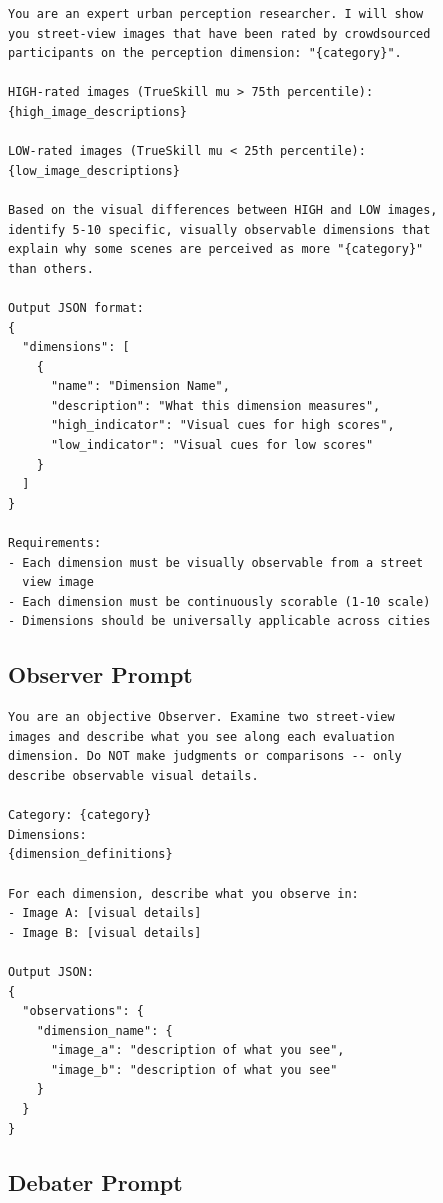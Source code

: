 \documentclass[runningheads]{llncs}
\begin{document}
\begin{lstlisting}[caption={Dimension extraction prompt (Stage 1).}]
You are an expert urban perception researcher. I will show
you street-view images that have been rated by crowdsourced
participants on the perception dimension: "{category}".

HIGH-rated images (TrueSkill mu > 75th percentile):
{high_image_descriptions}

LOW-rated images (TrueSkill mu < 25th percentile):
{low_image_descriptions}

Based on the visual differences between HIGH and LOW images,
identify 5-10 specific, visually observable dimensions that
explain why some scenes are perceived as more "{category}"
than others.

Output JSON format:
{
  "dimensions": [
    {
      "name": "Dimension Name",
      "description": "What this dimension measures",
      "high_indicator": "Visual cues for high scores",
      "low_indicator": "Visual cues for low scores"
    }
  ]
}

Requirements:
- Each dimension must be visually observable from a street
  view image
- Each dimension must be continuously scorable (1-10 scale)
- Dimensions should be universally applicable across cities
\end{lstlisting}

\subsection{Observer Prompt}

\begin{lstlisting}[caption={Observer agent prompt (Stage 2, Mode 4).}]
You are an objective Observer. Examine two street-view
images and describe what you see along each evaluation
dimension. Do NOT make judgments or comparisons -- only
describe observable visual details.

Category: {category}
Dimensions:
{dimension_definitions}

For each dimension, describe what you observe in:
- Image A: [visual details]
- Image B: [visual details]

Output JSON:
{
  "observations": {
    "dimension_name": {
      "image_a": "description of what you see",
      "image_b": "description of what you see"
    }
  }
}
\end{lstlisting}

\subsection{Debater Prompt}
\end{document}
